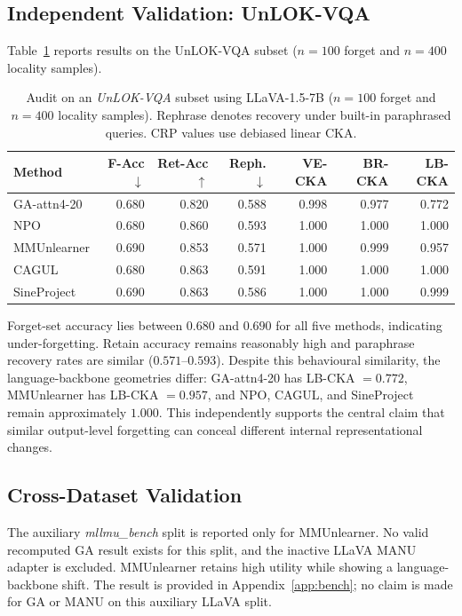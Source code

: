 \documentclass[letterpaper]{article}
\begin{document}
\subsection{Independent Validation: UnLOK-VQA}

Table~\ref{tab:unlok_full} reports results on the UnLOK-VQA subset
($n=100$ forget and $n=400$ locality samples).

\begin{table}[t]
\centering
\caption{Audit on an \emph{UnLOK-VQA} subset using LLaVA-1.5-7B
($n=100$ forget and $n=400$ locality samples). Rephrase denotes recovery
under built-in paraphrased queries. CRP values use debiased linear CKA.}
\label{tab:unlok_full}
\setlength{\tabcolsep}{3pt}
\small
\begin{tabular}{lrrrrrr}
\toprule
\textbf{Method} & \textbf{F-Acc}$\downarrow$
& \textbf{Ret-Acc}$\uparrow$ & \textbf{Reph.}$\downarrow$
& \textbf{VE-CKA} & \textbf{BR-CKA} & \textbf{LB-CKA} \\
\midrule
GA-attn4-20 & 0.680 & 0.820 & 0.588 & 0.998 & 0.977 & 0.772 \\
NPO         & 0.680 & 0.860 & 0.593 & 1.000 & 1.000 & 1.000 \\
MMUnlearner & 0.690 & 0.853 & 0.571 & 1.000 & 0.999 & 0.957 \\
CAGUL       & 0.680 & 0.863 & 0.591 & 1.000 & 1.000 & 1.000 \\
SineProject & 0.690 & 0.863 & 0.586 & 1.000 & 1.000 & 0.999 \\
\bottomrule
\end{tabular}
\end{table}

Forget-set accuracy lies between $0.680$ and $0.690$ for all five methods,
indicating under-forgetting. Retain accuracy remains reasonably high and
paraphrase recovery rates are similar ($0.571$--$0.593$). Despite this
behavioural similarity, the language-backbone geometries differ:
GA-attn4-20 has LB-CKA $=0.772$, MMUnlearner has LB-CKA $=0.957$, and NPO,
CAGUL, and SineProject remain approximately $1.000$. This independently
supports the central claim that similar output-level forgetting can conceal
different internal representational changes.

\subsection{Cross-Dataset Validation}

The auxiliary \emph{mllmu\_bench} split is reported only for MMUnlearner.
No valid recomputed GA result exists for this split, and the inactive LLaVA
MANU adapter is excluded. MMUnlearner retains high utility while showing a
language-backbone shift. The result is provided in
Appendix~\ref{app:bench}; no claim is made for GA or MANU on this auxiliary
LLaVA split.
\end{document}
